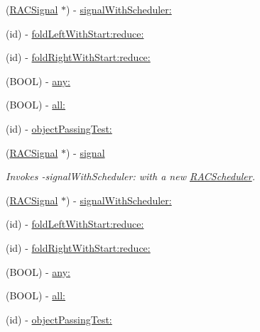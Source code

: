 \begin{DoxyCompactItemize}
(\mbox{\hyperlink{interface_r_a_c_signal}{R\+A\+C\+Signal}} $\ast$) -\/ \mbox{\hyperlink{interface_r_a_c_sequence_ac2b08c9ed5f9cae5c96f61578e9c3f5d}{signal\+With\+Scheduler\+:}}
\item 
(id) -\/ \mbox{\hyperlink{interface_r_a_c_sequence_a75b99901f0b8566a49eaee2099df7738}{fold\+Left\+With\+Start\+:reduce\+:}}
\item 
(id) -\/ \mbox{\hyperlink{interface_r_a_c_sequence_abc932140e0279336ed6829b6f91b577e}{fold\+Right\+With\+Start\+:reduce\+:}}
\item 
(B\+O\+OL) -\/ \mbox{\hyperlink{interface_r_a_c_sequence_abbd3bd6ea0a255fe346d8430b2cc586c}{any\+:}}
\item 
(B\+O\+OL) -\/ \mbox{\hyperlink{interface_r_a_c_sequence_a1042435c369460def379265597a1cfb0}{all\+:}}
\item 
(id) -\/ \mbox{\hyperlink{interface_r_a_c_sequence_a38ac274b6fbd87f0ea24f32d1a2d766b}{object\+Passing\+Test\+:}}
\item 
\mbox{\label{interface_r_a_c_sequence_a4033e6090ad2f5f2ac50a125aa8fd66a}} 
(\mbox{\hyperlink{interface_r_a_c_signal}{R\+A\+C\+Signal}} $\ast$) -\/ \mbox{\hyperlink{interface_r_a_c_sequence_a4033e6090ad2f5f2ac50a125aa8fd66a}{signal}}
\begin{DoxyCompactList}\small\item\em Invokes -\/signal\+With\+Scheduler\+: with a new \mbox{\hyperlink{interface_r_a_c_scheduler}{R\+A\+C\+Scheduler}}. \end{DoxyCompactList}\item 
(\mbox{\hyperlink{interface_r_a_c_signal}{R\+A\+C\+Signal}} $\ast$) -\/ \mbox{\hyperlink{interface_r_a_c_sequence_ac2b08c9ed5f9cae5c96f61578e9c3f5d}{signal\+With\+Scheduler\+:}}
\item 
(id) -\/ \mbox{\hyperlink{interface_r_a_c_sequence_a75b99901f0b8566a49eaee2099df7738}{fold\+Left\+With\+Start\+:reduce\+:}}
\item 
(id) -\/ \mbox{\hyperlink{interface_r_a_c_sequence_abc932140e0279336ed6829b6f91b577e}{fold\+Right\+With\+Start\+:reduce\+:}}
\item 
(B\+O\+OL) -\/ \mbox{\hyperlink{interface_r_a_c_sequence_abbd3bd6ea0a255fe346d8430b2cc586c}{any\+:}}
\item 
(B\+O\+OL) -\/ \mbox{\hyperlink{interface_r_a_c_sequence_a1042435c369460def379265597a1cfb0}{all\+:}}
\item 
(id) -\/ \mbox{\hyperlink{interface_r_a_c_sequence_a38ac274b6fbd87f0ea24f32d1a2d766b}{object\+Passing\+Test\+:}}

\end{DoxyCompactItemize}
